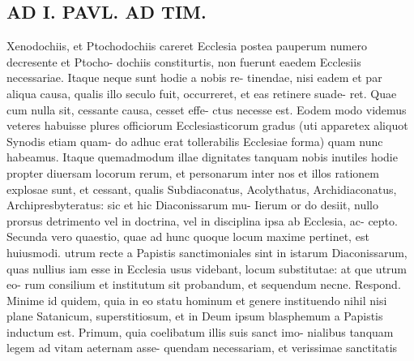\documentclass{article}
\begin{document}
\begin{pages}
\section*{AD I. PAVL. AD TIM. }
\marginpar{[ p.290 ]}Xenodochiis, et Ptochodochiis careret Ecclesia postea pauperum numero decresente et Ptocho- dochiis constiturtis, non fuerunt eaedem Ecclesiis necessariae. Itaque neque sunt hodie a nobis re- tinendae, nisi eadem et par aliqua causa, qualis illo seculo fuit, occurreret, et eas retinere suade- ret. Quae cum nulla sit, cessante causa, cesset effe- ctus necesse est. Eodem modo videmus veteres habuisse plures officiorum Ecclesiasticorum gradus (uti apparetex aliquot Synodis etiam quam- do adhuc erat tollerabilis Ecclesiae forma) quam nunc habeamus. Itaque quemadmodum illae dignitates tanquam nobis inutiles hodie propter diuersam locorum rerum, et personarum inter nos et illos rationem explosae sunt, et cessant, qualis Subdiaconatus, Acolythatus, Archidiaconatus, Archipresbyteratus: sic et hic Diaconissarum mu- Iierum or do desiit, nullo prorsus detrimento vel in doctrina, vel in disciplina ipsa ab Ecclesia, ac- cepto. Secunda vero quaestio, quae ad hunc quoque locum maxime pertinet, est huiusmodi. utrum recte a Papistis sanctimoniales sint in istarum Diaconissarum, quas nullius iam esse in Ecclesia usus videbant, locum substitutae: at que utrum eo- rum consilium et institutum sit probandum, et sequendum necne. Respond. Minime id quidem, quia in eo statu hominum et genere instituendo nihil nisi plane Satanicum, superstitiosum, et in Deum ipsum blasphemum a Papistis inductum est. Primum, quia coelibatum illis suis sanct imo- nialibus tanquam legem ad vitam aeternam asse- quendam necessariam, et verissimae sanctitatis 

\end{pages}
\end{document}

